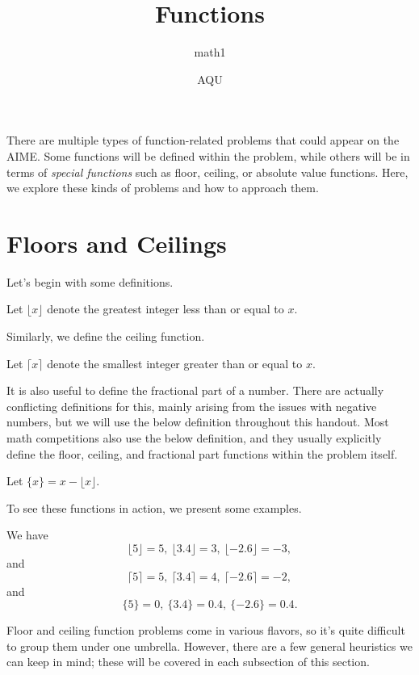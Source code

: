 \documentclass[mast]{lucky}
\title{Functions}
\author{math1}
\date{AQU}
\begin{document}
\maketitle
There are multiple types of function-related problems that could appear on the AIME.  Some functions will be defined within the problem,  while others will be in terms of \emph{special functions} such as floor,  ceiling, or absolute value functions.  Here, we explore these kinds of problems and how to approach them.

\section{Floors and Ceilings}

Let's begin with some definitions.

\begin{defi}
Let $\lfloor x \rfloor$ denote the greatest integer less than or equal to $x$.
\end{defi}

Similarly, we define the ceiling function.

\begin{defi}
Let $\lceil x \rceil$ denote the smallest integer greater than or equal to $x$.
\end{defi}

It is also useful to define the fractional part of a number. There are actually conflicting definitions for this, mainly arising from the issues with negative numbers, but we will use the below definition throughout this handout. Most math competitions also use the below definition, and they usually explicitly define the floor, ceiling, and fractional part functions within the problem itself.

\begin{defi}
Let $\{ x \} = x - \lfloor x \rfloor$.
\end{defi}

To see these functions in action, we present some examples.

\begin{exam}
We have $$\lfloor 5 \rfloor = 5, \ \lfloor 3.4 \rfloor = 3, \ \lfloor -2.6 \rfloor = -3,$$
and $$\lceil 5 \rceil = 5, \ \lceil 3.4 \rceil = 4, \ \lceil -2.6 \rceil = -2,$$
and $$\{ 5 \} = 0, \ \{ 3.4 \} = 0.4, \ \{ -2.6 \} = 0.4.$$
\end{exam}

Floor and ceiling function problems come in various flavors, so it's quite difficult to group them under one umbrella. However, there are a few general heuristics we can keep in mind; these will be covered in each subsection of this section.
\end{document}
